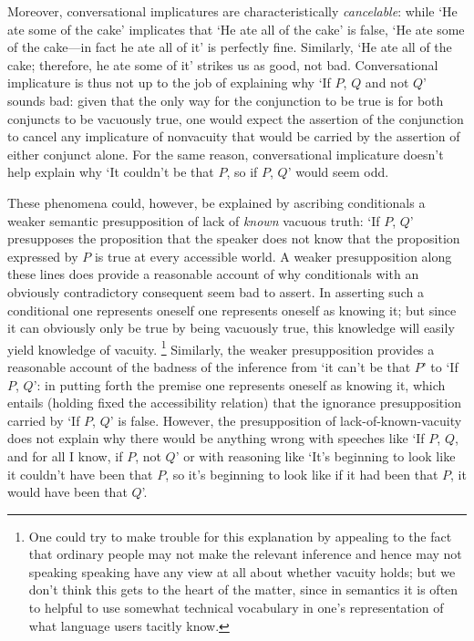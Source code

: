 \documentclass[If.tex]{subfiles}
\begin{document}
Moreover, conversational implicatures are characteristically \emph{cancelable}: while ‘He ate some of the cake’ implicates that ‘He ate all of the cake’ is false, ‘He ate some of the cake---in fact he ate all of it’ is perfectly fine.  Similarly, ‘He ate all of the cake; therefore, he ate some of it’ strikes us as good, not bad.  Conversational implicature is thus not up to the job of explaining why ‘If $P$, $Q$ and not $Q$’ sounds bad: given that the only way for the conjunction to be true is for both conjuncts to be vacuously true, one would expect the assertion of the conjunction to cancel any implicature of nonvacuity that would be carried by the assertion of either conjunct alone.  For the same reason, conversational implicature doesn't help explain why ‘It couldn't be that $P$, so if $P$, $Q$’ would seem odd.  


These phenomena could, however, be explained by ascribing conditionals a weaker semantic presupposition of lack of \emph{known} vacuous truth: ‘If $P$, $Q$’ presupposes the proposition that the speaker does not know that the proposition expressed by $P$ is true at every accessible world.  A weaker presupposition along these lines does provide a reasonable account of why conditionals with an obviously contradictory consequent seem bad to assert.  In asserting such a conditional one represents oneself one represents oneself as knowing it; but since it can obviously only be true by being vacuously true, this knowledge will easily yield knowledge of vacuity.%
\footnote{One could try to make trouble for this explanation by appealing to the fact that ordinary people may not make the relevant inference and hence may not speaking speaking have any view at all about whether vacuity holds; but we don't think this gets to the heart of the matter, since in semantics it is often to helpful to use somewhat technical vocabulary in one's representation of what language users tacitly know.}
Similarly, the weaker presupposition provides a reasonable account of the badness of the inference from ‘it can't be that $P$’ to ‘If $P$, $Q$’: in putting forth the premise one represents oneself as knowing it, which entails (holding fixed the accessibility relation) that the ignorance presupposition carried by ‘If $P$, $Q$’ is false.  However, the presupposition of lack-of-known-vacuity does not explain why there would be anything wrong with speeches like ‘If $P$, $Q$, and for all I know, if $P$, not $Q$’ or with reasoning like ‘It's beginning to look like it couldn't have been that $P$, so it's beginning to look like if it had been that $P$, it would have been that $Q$’.  
\end{document}
